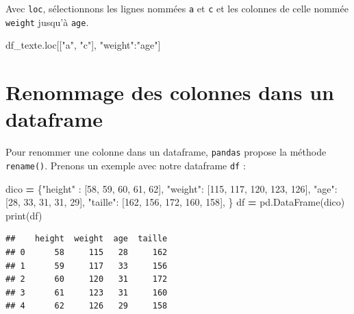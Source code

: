 \documentclass[12pt,]{book}
\newenvironment{Shaded}{\begin{snugshade}}{\end{snugshade}}
\newcommand{\DecValTok}[1]{\textcolor[rgb]{0.00,0.00,0.81}{#1}}
\newcommand{\StringTok}[1]{\textcolor[rgb]{0.31,0.60,0.02}{#1}}
\newcommand{\OperatorTok}[1]{\textcolor[rgb]{0.81,0.36,0.00}{\textbf{#1}}}
\newcommand{\BuiltInTok}[1]{#1}
\newcommand{\NormalTok}[1]{#1}
\numberwithin{equation}{section}
\numberwithin{countremarque}{section}
\begin{document}
Avec \texttt{loc}, sélectionnons les lignes nommées \texttt{a} et
\texttt{c} et les colonnes de celle nommée \texttt{weight} jusqu'à
\texttt{age}.

\begin{Shaded}
\begin{Highlighting}[]
\NormalTok{df_texte.loc[[}\StringTok{"a"}\NormalTok{, }\StringTok{"c"}\NormalTok{], }\StringTok{"weight"}\NormalTok{:}\StringTok{"age"}\NormalTok{]}
\end{Highlighting}
\end{Shaded}

\section{Renommage des colonnes dans un
dataframe}\label{renommage-des-colonnes-dans-un-dataframe}

Pour renommer une colonne dans un dataframe, \texttt{pandas} propose la
méthode \texttt{rename()}. Prenons un exemple avec notre dataframe
\texttt{df} :

\begin{Shaded}
\begin{Highlighting}[]
\NormalTok{dico }\OperatorTok{=}\NormalTok{ \{}\StringTok{"height"}\NormalTok{ : [}\DecValTok{58}\NormalTok{, }\DecValTok{59}\NormalTok{, }\DecValTok{60}\NormalTok{, }\DecValTok{61}\NormalTok{, }\DecValTok{62}\NormalTok{],}
        \StringTok{"weight"}\NormalTok{: [}\DecValTok{115}\NormalTok{, }\DecValTok{117}\NormalTok{, }\DecValTok{120}\NormalTok{, }\DecValTok{123}\NormalTok{, }\DecValTok{126}\NormalTok{],}
        \StringTok{"age"}\NormalTok{: [}\DecValTok{28}\NormalTok{, }\DecValTok{33}\NormalTok{, }\DecValTok{31}\NormalTok{, }\DecValTok{31}\NormalTok{, }\DecValTok{29}\NormalTok{],}
        \StringTok{"taille"}\NormalTok{: [}\DecValTok{162}\NormalTok{, }\DecValTok{156}\NormalTok{, }\DecValTok{172}\NormalTok{, }\DecValTok{160}\NormalTok{, }\DecValTok{158}\NormalTok{],}
\NormalTok{       \} }
\NormalTok{df }\OperatorTok{=}\NormalTok{ pd.DataFrame(dico)}
\BuiltInTok{print}\NormalTok{(df)}
\end{Highlighting}
\end{Shaded}

\begin{lstlisting}
##    height  weight  age  taille
## 0      58     115   28     162
## 1      59     117   33     156
## 2      60     120   31     172
## 3      61     123   31     160
## 4      62     126   29     158
\end{lstlisting}
\end{document}
